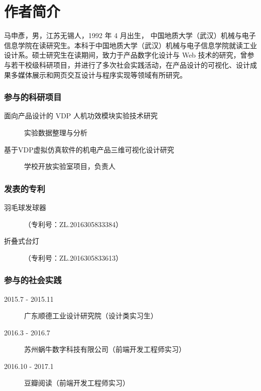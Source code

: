 \chapter*{作者简介}
\begin{spacing}{1.3}

马申彥，男，江苏无锡人，1992 年 4 月出生，
中国地质大学（武汉）机械与电子信息学院在读研究生。本科于中国地质大学（武汉）机械与电子信息学院就读工业设计系。硕士研究生在读期间，致力于产品数字化设计与 Web 技术的研究，曾参与若干校级科研项目，并进行了多次社会实践活动，在产品设计的可视化、设计成果多媒体展示和网页交互设计与程序实现等领域有所研究。

% 
\end{spacing}

\subsection*{参与的科研项目}
\begin{description}
	\item[面向产品设计的 VDP 人机功效模块实验技术研究] 实验数据整理与分析
	\item[基于VDP虚拟仿真软件的机电产品三维可视化设计研究] 学校开放实验室项目，负责人
\end{description}

\vskip 12pt

\subsection*{发表的专利}
\begin{description}
	\item[羽毛球发球器]（专利号：ZL.2016305833384）
	\item[折叠式台灯]（专利号：ZL.2016305833613）
\end{description}

\vskip 12pt

\subsection*{参与的社会实践}
\begin{description}
	\item[2015.7 - 2015.11] 广东顺德工业设计研究院（设计类实习生）
	\item[2016.3 - 2016.7] 苏州蜗牛数字科技有限公司（前端开发工程师实习）
	\item[2016.10 - 2017.1] 豆瓣阅读（前端开发工程师实习）
\end{description}